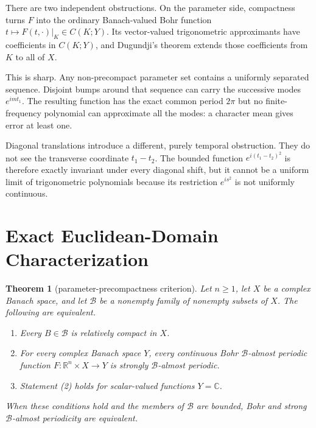 \documentclass[11pt]{article}
\newtheorem{theorem}{Theorem}
\newcommand{\R}{\mathbb R}
\newcommand{\C}{\mathbb C}
\newcommand{\B}{\mathcal B}
\begin{document}
There are two independent obstructions.  On the parameter side, compactness
turns $F$ into the ordinary Banach-valued Bohr function
$t\mapsto F(t,\cdot)|_K\in C(K;Y)$.  Its vector-valued trigonometric
approximants have coefficients in $C(K;Y)$, and Dugundji's theorem extends
those coefficients from $K$ to all of $X$.

This is sharp.  Any non-precompact parameter set contains a uniformly
separated sequence.  Disjoint bumps around that sequence can carry the
successive modes $e^{imt_1}$.  The resulting function has the exact common
period $2\pi$ but no finite-frequency polynomial can approximate all the
modes: a character mean gives error at least one.

Diagonal translations introduce a different, purely temporal obstruction.
They do not see the transverse coordinate $t_1-t_2$.  The bounded function
$e^{i(t_1-t_2)^2}$ is therefore exactly invariant under every diagonal shift,
but it cannot be a uniform limit of trigonometric polynomials because its
restriction $e^{is^2}$ is not uniformly continuous.

\section*{Exact Euclidean-Domain Characterization}

\begin{theorem}[parameter-precompactness criterion]\label{thm:main}
Let $n\geq1$, let $X$ be a complex Banach space, and let $\B$ be a nonempty
family of nonempty subsets of $X$.  The following are equivalent.
\begin{enumerate}
\item Every $B\in\B$ is relatively compact in $X$.
\item For every complex Banach space $Y$, every continuous Bohr
$\B$-almost periodic function $F:\R^n\times X\to Y$ is strongly
$\B$-almost periodic.
\item Statement \textup{(2)} holds for scalar-valued functions $Y=\C$.
\end{enumerate}
When these conditions hold and the members of $\B$ are bounded, Bohr and
strong $\B$-almost periodicity are equivalent.
\end{theorem}
\end{document}
